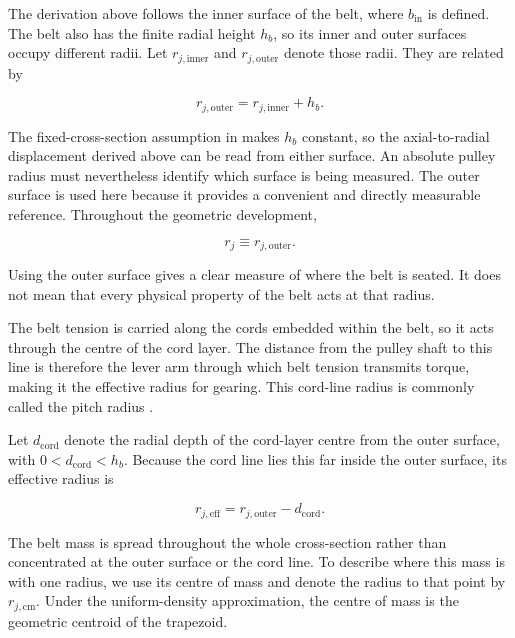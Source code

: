 \documentclass[11pt]{report}
\numberwithin{equation}{section}
\newcounter{assump}
\begin{document}
The derivation above follows the inner surface of the belt, where
\(b_{\mathrm{in}}\) is defined. The belt also has the finite radial height
\(h_b\), so its inner and outer surfaces occupy different radii. Let
\(r_{j,\mathrm{inner}}\) and \(r_{j,\mathrm{outer}}\) denote those radii.
They are related by

\begin{equation}
r_{j,\mathrm{outer}}
=
r_{j,\mathrm{inner}}+h_b.
\label{eq:inner_outer_radius_relation}
\end{equation}

The fixed-cross-section assumption in
 makes \(h_b\) constant, so the
axial-to-radial displacement derived above can be read from either surface.
An absolute pulley radius must nevertheless identify which surface is being
measured. The outer surface is used here because it provides a convenient and
directly measurable reference. Throughout the geometric development,

\begin{equation}
r_j
\equiv
r_{j,\mathrm{outer}}.
\label{eq:geometry_radius_convention}
\end{equation}

Using the outer surface gives a clear measure of where the belt is seated. It
does not mean that every physical property of the belt acts at that radius.

The belt tension is carried along the cords embedded within the belt, so it
acts through the centre of the cord layer. The distance from the pulley shaft
to this line is therefore the lever arm through which belt tension transmits
torque, making it the effective radius for gearing. This cord-line radius is
commonly called the pitch radius \citep{Gerbert1996}.

Let \(d_{\mathrm{cord}}\) denote the radial depth of the cord-layer centre from
the outer surface, with \(0<d_{\mathrm{cord}}<h_b\). Because the cord line
lies this far inside the outer surface, its effective radius is

\begin{equation}
r_{j,\mathrm{eff}}
=
r_{j,\mathrm{outer}}-d_{\mathrm{cord}}.
\label{eq:local_belt_effective_radius}
\end{equation}

The belt mass is spread throughout the whole cross-section rather than
concentrated at the outer surface or the cord line. To describe where this
mass is with one radius, we use its centre of mass and denote the radius to
that point by \(r_{j,\mathrm{cm}}\). Under the uniform-density approximation,
the centre of mass is the geometric centroid of the trapezoid.
\end{document}
